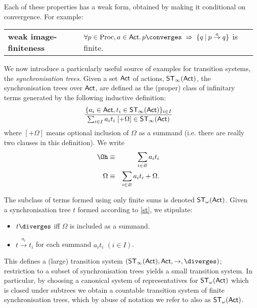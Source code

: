 Each of these properties has a weak form, obtained by making it conditional on convergence. For example:
\begin{center}
\begin{tabular}{ll}
{\bf weak image-finiteness} &
$\forall p \in {\rm Proc} , a \in {\sf Act} . \, p \converges \; \Rightarrow \; \{ q \: | \: p \stackrel{a}{\rightarrow} q \}$ is finite. 
\end{tabular}
\end{center}

We now introduce a particularly useful source of examples for transition systems, the {\em synchronisation trees}.
Given a set ${\sf Act}$ of actions, ${\sf ST}_{\infty}({\sf Act})$, the synchronisation trees over ${\sf Act}$, are defined as the (proper) class of infinitary terms generated by the following inductive definition:
\begin{equation}
\frac{ \{ a_{i} \in {\sf Act}, t_{i} \in {\sf ST}_{\infty}({\sf Act}) \}_{i \in I}}{\sum_{i \in I} a_{i}t_{i} \; [ + \Omega ] \in {\sf ST}_{\infty}({\sf Act})} \label{st}
\end{equation}
where $[ + \Omega ]$ means optional inclusion of $\Omega$ as a summand (i.e. there are really two clauses in this definition). We write
\begin{eqnarray*}
\Oh & \equiv & \sum_{i \in \varnothing} a_{i}t_{i} \\
\Omega & \equiv & \sum_{i \in \varnothing} a_{i}t_{i} + \Omega .
\end{eqnarray*}

The subclass of terms formed using only finite sums is denoted 
${\sf ST}_{\omega}({\sf Act})$. 
Given a synchronisation tree $t$ formed according to \ref{st}, we stipulate:
\begin{itemize}
\item $t \diverges$ iff $\Omega$ is included as a summand.
\item $t \stackrel{a_{i}}{\rightarrow} t_{i}$ for each summand $a_{i}t_{i}$ $(i \in I)$.
\end{itemize}

This defines a (large) transition system $( {\sf ST}_{\infty}({\sf Act}) , {\sf Act}, \rightarrow , \diverges )$; restriction to a subset of synchronisation trees yields a small transition system. 
In particular, by choosing a canonical system of representatives for ${\sf ST}_{\omega}({\sf Act})$ which is closed under subtrees 
we obtain a countable transition system of finite synchronisation trees, which by abuse of notation we refer to also as ${\sf ST}_{\omega}({\sf Act})$.

